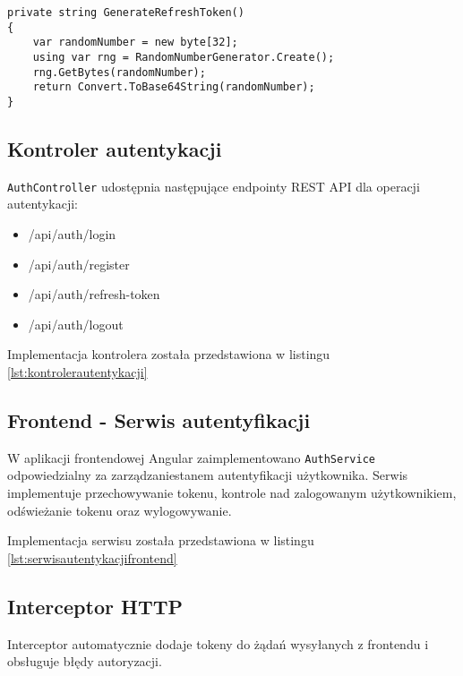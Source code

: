 \begin{lstlisting}[style=csharp, caption={Generowanie tokenu odświeżającego}]
private string GenerateRefreshToken()
{
	var randomNumber = new byte[32];
	using var rng = RandomNumberGenerator.Create();
	rng.GetBytes(randomNumber);
	return Convert.ToBase64String(randomNumber);
}
\end{lstlisting}

\subsection{Kontroler autentykacji}
\texttt{AuthController} udostępnia następujące endpointy REST API dla operacji autentykacji:
\begin{itemize}
	\item /api/auth/login
	\item /api/auth/register
	\item /api/auth/refresh-token
	\item /api/auth/logout
\end{itemize}

Implementacja kontrolera została przedstawiona w listingu \ref{lst:kontrolerautentykacji}

\subsection{Frontend - Serwis autentyfikacji}
W aplikacji frontendowej Angular zaimplementowano \texttt{AuthService} odpowiedzialny za zarządzaniestanem autentyfikacji użytkownika.
Serwis implementuje przechowywanie tokenu, kontrole nad zalogowanym użytkownikiem, odświeżanie tokenu oraz wylogowywanie.

Implementacja serwisu została przedstawiona w listingu \ref{lst:serwisautentykacjifrontend}

\subsection{Interceptor HTTP}

Interceptor automatycznie dodaje tokeny do żądań wysyłanych z frontendu i obsługuje błędy autoryzacji.

